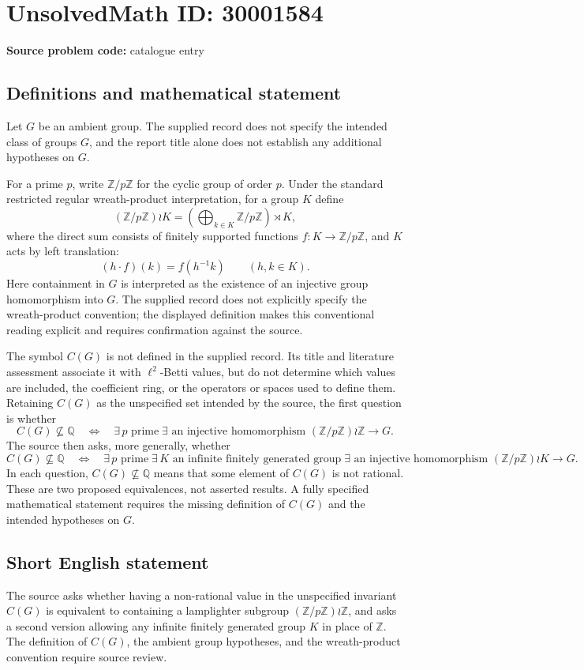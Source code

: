 \documentclass[11pt]{article}
\newcommand{\Z}{\mathbb{Z}}
\newcommand{\Q}{\mathbb{Q}}
\begin{document}
\section*{UnsolvedMath ID: 30001584}
\textbf{Source problem code:} catalogue entry
\subsection{Definitions and mathematical statement}
Let \(G\) be an ambient group. The supplied record does not specify the intended class of groups \(G\), and the report title alone does not establish any additional hypotheses on \(G\).

For a prime \(p\), write \(\Z/p\Z\) for the cyclic group of order \(p\). Under the standard restricted regular wreath-product interpretation, for a group \(K\) define
\[
(\Z/p\Z)\wr K
=
\left(\bigoplus_{k\in K}\Z/p\Z\right)\rtimes K,
\]
where the direct sum consists of finitely supported functions \(f:K\to\Z/p\Z\), and \(K\) acts by left translation:
\[
(h\cdot f)(k)=f(h^{-1}k)\qquad(h,k\in K).
\]
Here containment in \(G\) is interpreted as the existence of an injective group homomorphism into \(G\). The supplied record does not explicitly specify the wreath-product convention; the displayed definition makes this conventional reading explicit and requires confirmation against the source.

The symbol \(C(G)\) is not defined in the supplied record. Its title and literature assessment associate it with \(\ell^2\)-Betti values, but do not determine which values are included, the coefficient ring, or the operators or spaces used to define them. Retaining \(C(G)\) as the unspecified set intended by the source, the first question is whether
\[
C(G)\not\subseteq\Q
\quad\Longleftrightarrow\quad
\exists\,p\text{ prime}\;\exists\text{ an injective homomorphism }
(\Z/p\Z)\wr\Z\longrightarrow G.
\]
The source then asks, more generally, whether
\[
C(G)\not\subseteq\Q
\quad\Longleftrightarrow\quad
\exists\,p\text{ prime}\;\exists\,K\text{ an infinite finitely generated group}\;
\exists\text{ an injective homomorphism }
(\Z/p\Z)\wr K\longrightarrow G.
\]
In each question, \(C(G)\not\subseteq\Q\) means that some element of \(C(G)\) is not rational. These are two proposed equivalences, not asserted results. A fully specified mathematical statement requires the missing definition of \(C(G)\) and the intended hypotheses on \(G\).
\subsection{Short English statement}
The source asks whether having a non-rational value in the unspecified invariant \(C(G)\) is equivalent to containing a lamplighter subgroup \((\Z/p\Z)\wr\Z\), and asks a second version allowing any infinite finitely generated group \(K\) in place of \(\Z\). The definition of \(C(G)\), the ambient group hypotheses, and the wreath-product convention require source review.
\end{document}
